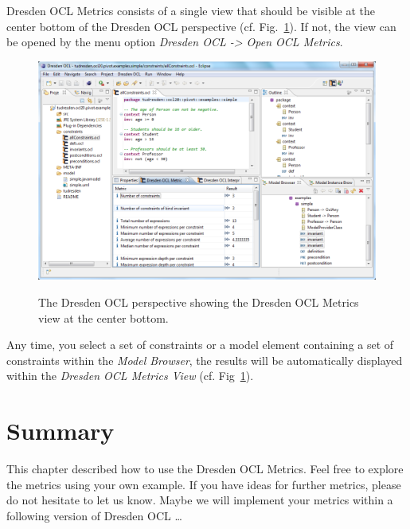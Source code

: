 Dresden OCL Metrics consists of a single view that should be visible at the
center bottom of the Dresden OCL perspective (cf.
Fig.~\ref{pic:metrics:metrics01}). If not, the view can be opened by the menu
option \emph{Dresden OCL -> Open OCL Metrics}.

\begin{figure}[!t]
	\centering
	\includegraphics[width=1.0\textwidth]{figures/metrics/metrics01.png}
	\label{pic:metrics:metrics01}
	\caption{The Dresden OCL perspective showing the Dresden OCL Metrics view at
	the center bottom.}
\end{figure}

Any time, you select a set of constraints or a model element containing a set of
constraints within the \emph{Model Browser}, the results will be automatically
displayed within the \emph{Dresden OCL Metrics View} (cf.
Fig~\ref{pic:metrics:metrics01}).

	
\section{Summary}
  
This chapter described how to use the Dresden OCL Metrics. Feel free to explore
the metrics using your own example. If you have ideas for further metrics,
please do not hesitate to let us know. Maybe we will implement your metrics
within a following version of Dresden OCL \ldots
